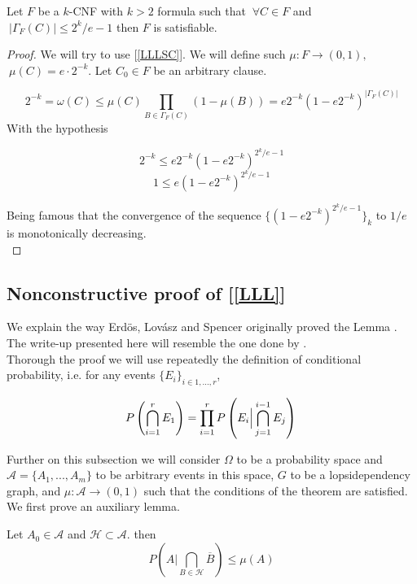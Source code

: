 \begin{corollary}
	Let $F$ be a $k$-CNF with $k>2$ formula such that $\ \forall C \in F$ and $\ |\Gamma_F(C)|\le 2^k/e-1$ then $F$ is satisfiable.
\end{corollary}
\begin{proof}
	
	 We will try to use [\ref{LLLSC}]. We will define such $\mu: F \to (0,1),$$\ \mu(C)=e\cdot 2^{-k}$. Let $C_0\in F$ be an arbitrary clause.
	 
	 \[
	 2^{-k}=\omega(C)\le  \mu(C) \prod_{B\in\Gamma_F(C)} (1-\mu(B)) = e2^{-k}(1-e 2^{-k})^{|\Gamma_F(C)|}
	 \]
	 With the hypothesis
	 
	\[
		 2^{-k} \le  e 2^{-k}(1-e2^{-k})^{2^k/e-1}\]\[
		 1  \le e(1-e2^{-k})^{2^k/e-1}
	\]
	
	Being famous that the convergence of the sequence $\{(1-e2^{-k})^{2^k/e-1}\}_k$ to $1/e$ is monotonically decreasing.\\
\end{proof}



\subsection{Nonconstructive proof of [\ref{LLL}]}

We explain the way Erdös, Lovász and Spencer originally proved the Lemma \cite{erdos1973problems} \cite{spencer1977asymptotic}. The write-up presented here will resemble the one done by
 \cite{moser2013exact}.\\



Thorough the proof we will use repeatedly the definition of conditional probability, i.e. for any events $\{E_i\}_{i\in 1,...,r}$,

\[
P\left ( \bigcap_{i=1}^r E_1\right ) = \prod_{i=1}^rP \left( E_i \Big | \bigcap_{j=1}^{i-1} E_j\right)\\
\]

Further on this subsection we will consider  $\Omega$ to be a probability space and $\mathcal{A} = \{A_1,...,A_m\}$ to be arbitrary events in this space, $G$ to be a lopsidependency graph, and $\mu: \mathcal{A} \to (0,1)$ such that the conditions of the theorem are satisfied. We first prove an auxiliary lemma.

\begin{lemma} \label{LemaLLL}
Let $ A_0 \in \mathcal{A} $ and $\mathcal{H}\subset \mathcal{A} $. then 
\[
	P\left ( A \Big| \bigcap_{B\in \mathcal{H}} \overline{B}\right ) \le \mu(A) 
\]

		
\end{lemma}


